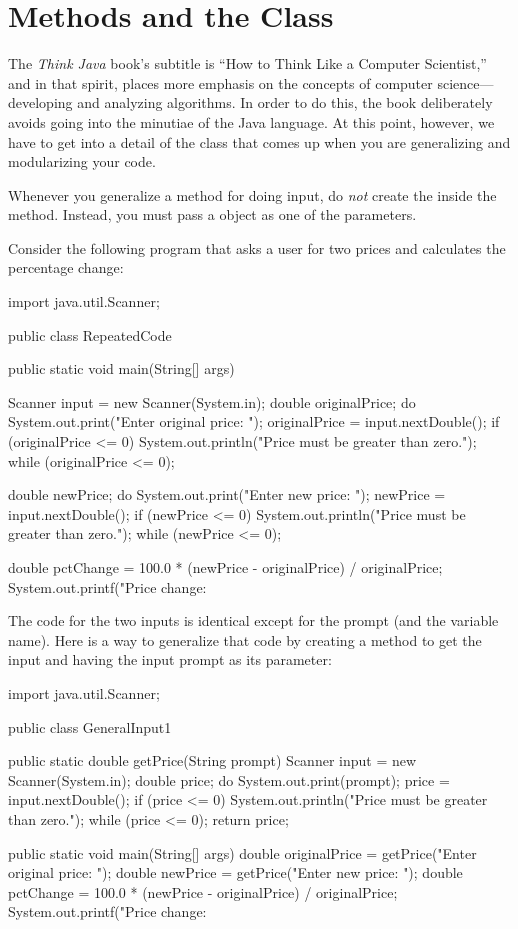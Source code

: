 \section{Methods and the  Class}

The {\em Think Java} book's subtitle is ``How to Think Like a Computer Scientist,'' and in that spirit, places more emphasis on the concepts of computer science---developing and analyzing algorithms. In order to do this, the book deliberately avoids going into the minutiae of the Java language. At this point, however, we have to get into a detail of the  class that comes up when you are generalizing and modularizing your code.

Whenever you generalize a method for doing input, do {\em not} create the  inside the method. Instead, you must pass a  object as one of the parameters.

Consider the following program that asks a user for two prices and calculates the percentage change:


\begin{code}
import java.util.Scanner;

public class RepeatedCode {
  public static void main(String[] args) {
    Scanner input = new Scanner(System.in);
    double originalPrice;
    do {
      System.out.print("Enter original price: ");
      originalPrice = input.nextDouble();
      if (originalPrice <= 0) {
        System.out.println("Price must be greater than zero.");
      }
    } while (originalPrice <= 0);
    
    double newPrice;
    do {
      System.out.print("Enter new price: ");
      newPrice = input.nextDouble();
      if (newPrice <= 0) {
        System.out.println("Price must be greater than zero.");
      }
    } while (newPrice <= 0);
    
    double pctChange = 100.0 *
      (newPrice - originalPrice) / originalPrice;
    System.out.printf("Price change: %
  }
}
\end{code}


The code for the two inputs is identical except for the prompt (and the variable name). Here is a way to generalize that code by creating a method to get the input and having the input prompt as its parameter:

\begin{code}
import java.util.Scanner;

public class GeneralInput1 {
  
  public static double getPrice(String prompt) {
    Scanner input = new Scanner(System.in);
    double price;
    do {
      System.out.print(prompt);
      price = input.nextDouble();
      if (price <= 0) {
        System.out.println("Price must be greater than zero.");
      }
    } while (price <= 0);
    return price;
  }

    
  public static void main(String[] args) {
    double originalPrice = getPrice("Enter original price: ");
    double newPrice = getPrice("Enter new price: ");
    double pctChange = 100.0 *
      (newPrice - originalPrice) / originalPrice;
    System.out.printf("Price change: %
  }
}
\end{code}


